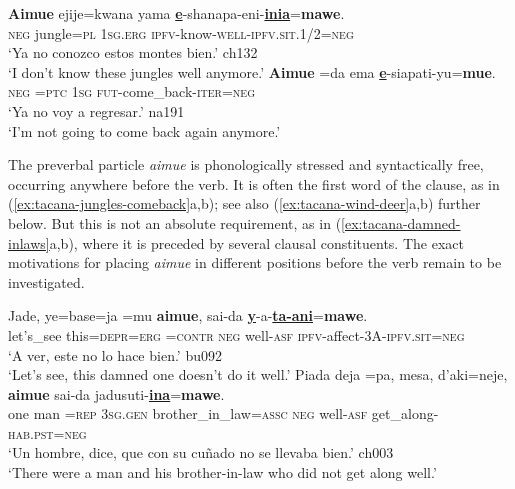 \documentclass[output=paper]{langsci/langscibook}
\begin{document}
\begin{exe}\ex
\label{ex:tacana-jungles-comeback}      
\begin{xlist}
\ex\label{ex:tacana-jungles}  
\gll \textbf{Aimue} ejije=kwana yama \textbf{\uline{e}}-shanapa-eni-\textbf{\uline{inia}}=\textbf{mawe}.\\
    \textsc{neg}  jungle=\textsc{pl}  \textsc{1sg.erg}
    \textsc{ipfv}-know-\textsc{well-ipfv.sit.}1/2=\textsc{neg}\\
\glt `Ya no conozco estos montes bien.' ch132\\
`I don't know these jungles well anymore.'
\ex\label{ex:tacana-comeback}
\gll  \textbf{Aimue}  =da ema \textbf{\uline{e}}-siapati-yu=\textbf{mue}.\\
    \textsc{neg}  \textsc{=ptc}  \textsc{1sg}
    \textsc{fut}-come\_back-\textsc{iter=neg}\\
\glt `Ya no voy a regresar.' na191\\
`I'm not going to come back again anymore.'
\end{xlist}\end{exe}

The preverbal particle \textit{aimue} is phonologically stressed and
syntactically free, occurring anywhere before the verb. It is often
the first word of the clause, as in (\ref{ex:tacana-jungles-comeback}a,b); see also (\ref{ex:tacana-wind-deer}a,b) further below. But this is not an
absolute requirement, as in (\ref{ex:tacana-damned-inlaws}a,b), where it is
preceded by several clausal constituents. The exact motivations for placing
\textit{aimue} in different positions before the verb remain to be
investigated.

\begin{exe}\ex\label{ex:tacana-damned-inlaws}      
\begin{xlist}
\ex\label{ex:tacana-damned}
\gll  Jade, ye=base=ja{\cb}  =mu  \textbf{aimue},  sai-da
 \textbf{\uline{y}}-a-\textbf{\uline{ta-ani}}=\textbf{mawe}.\\
    let's\_see  this=\textsc{depr}=\textsc{erg}  \textsc{=contr}
    \textsc{neg}  well-\textsc{asf}
    \textsc{ipfv-}affect-3A-\textsc{ipfv.sit=neg}\\
\glt `A ver, este no lo hace bien.' bu092\\
`Let's see, this damned one doesn't do it well.'
\ex\label{ex:tacana-inlaws}
\gll {}Piada deja{\cb} =pa,
{\ob}mesa,  d'aki=neje{\cb},  \textbf{aimue} sai-da
jadusuti-\textbf{\uline{ina}}=\textbf{mawe}.\\
one  man  =\textsc{rep}  \textsc{3sg.gen}
    brother\_in\_law=\textsc{assc}  \textsc{neg}  well-\textsc{asf}
    get\_along-\textsc{hab.pst=neg}\\
\glt `Un hombre, dice, que con su cuñado no se llevaba bien.' ch003\\
`There were a man and his brother-in-law who did not get along well.'
\end{xlist}\end{exe}
\end{document}
